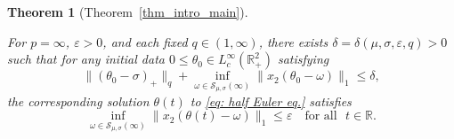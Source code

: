 \documentclass[11pt]{amsart}
\newtheorem{theorem}{Theorem}[section]
\theoremstyle{definition}
\theoremstyle{definition}
\numberwithin{equation}{section}
\newcommand{\0}{\emptyset}
\newcommand{\bbR}{\mathbb R}
\newcommand{\calS}{\mathcal S}
\newcommand{\varep}{\varepsilon}
\begin{document}
\begin{theorem}[Theorem~\ref{thm_intro_main}]
\begin{enumerate}[itemsep=1em, topsep=1em]
                    For $p = \infty$, $\varep >0$, and each fixed $q \in (1, \infty)$, there exists $\delta = \delta(\mu, \sigma, \varepsilon, q) > 0$ such that for any initial data $0 \le \theta_0 \in  L_c^{\infty}(\bbR^2_+)$ satisfying
                    \[
                     {\| (\theta_0 - \sigma)_+ \|_q}  +   \inf_{\omega \in \calS_{\mu, \sigma}(\infty)} \| x_2 (\theta_0 - \omega ) \|_1 \le \delta,
                    \]
                    the corresponding solution $\theta(t)$ to 
                    {\eqref{eq: half Euler eq.}}
                    satisfies
                    \[
                    \inf_{\omega \in \calS_{\mu, \sigma}(\infty)} \| x_2(\theta(t) - \omega) \|_1 \le \varepsilon \quad \textrm{for all } \,\, t \in \bbR.
                    \]
                    
				\end{enumerate}
			\end{theorem}
			
\end{document}
